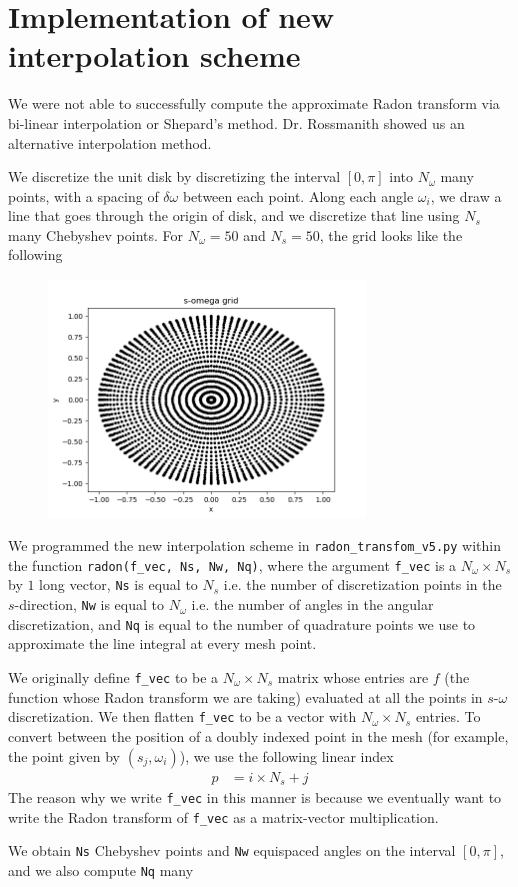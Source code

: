 \documentclass[12pt]{article}
\begin{document}
\section*{Implementation of new interpolation scheme}
We were not able to successfully compute the approximate Radon transform via bi-linear interpolation or Shepard's method.
Dr. Rossmanith showed us an alternative interpolation method.
\par 
We discretize the unit disk by discretizing the interval $[0, \pi]$ into $N_{\omega}$ many points, with a spacing of $\delta \omega$ between each point.
Along each angle $\omega_{i}$, we draw a line that goes through the origin of disk, and we discretize that line using $N_{s}$ many Chebyshev points.
For $N_{\omega} = 50$ and $N_{s} = 50$, the grid looks like the following
\begin{figure}[H]
	\centering
	\includegraphics[width=0.75\textwidth]{s_omega_grid.png}
\end{figure}
We programmed the new interpolation scheme in \verb|radon_transfom_v5.py| within the function \verb|radon(f_vec, Ns, Nw, Nq)|, where the argument \verb|f_vec| is a $N_{\omega} \times N_s$ by $1$ long vector, \verb|Ns| is equal to $N_{s}$ i.e. the number of discretization points in the $s$-direction, \verb|Nw| is equal to $N_{\omega}$ i.e. the number of angles in the angular discretization, and \verb|Nq| is equal to the number of quadrature points we use to approximate the line integral at every mesh point.
\par
We originally define \verb|f_vec| to be a $N_{\omega} \times N_{s}$ matrix whose entries are $f$ (the function whose Radon transform we are taking) evaluated at all the points in $s$-$\omega$ discretization. 
We then flatten \verb|f_vec| to be a vector with $N_{\omega} \times N_{s}$ entries.
To convert between the position of a doubly indexed point in the mesh (for example, the point given by $(s_{j}, \omega_{i})$), we use the following linear index
\begin{align*}
	p & = i \times N_{s} + j
\end{align*}
The reason why we write \verb|f_vec| in this manner is because we eventually want to write the Radon transform of \verb|f_vec| as a matrix-vector multiplication.
\par
We obtain \verb|Ns| Chebyshev points and \verb|Nw| equispaced angles on the interval $[0, \pi]$, and we also compute \verb|Nq| many 
\end{document}

